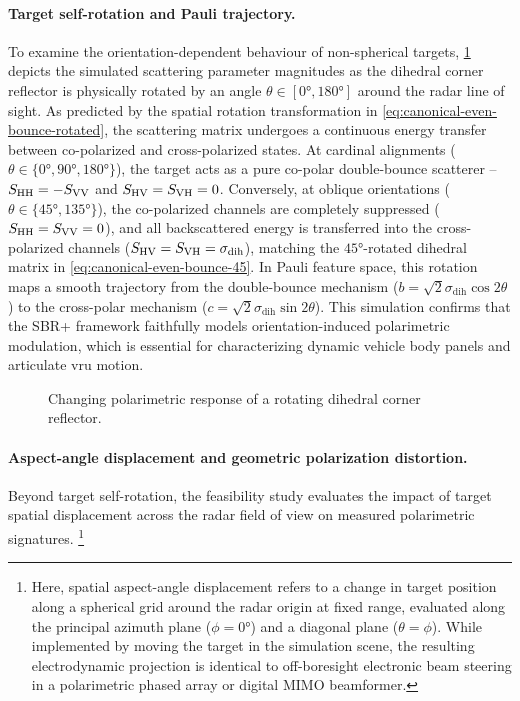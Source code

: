 \paragraph{Target self-rotation and Pauli trajectory.}
To examine the orientation-dependent behaviour of non-spherical targets, \cref{fig:sbr_parametric_dihedral_self_rotation} depicts the simulated scattering parameter magnitudes as the dihedral corner reflector is physically rotated by an angle $\theta \in [\ang{0}, \ang{180}]$ around the radar line of sight.
As predicted by the spatial rotation transformation in \cref{eq:canonical-even-bounce-rotated}, the scattering matrix undergoes a continuous energy transfer between co-polarized and cross-polarized states.
At cardinal alignments ($\theta \in \{\ang{0}, \ang{90}, \ang{180}\}$), the target acts as a pure co-polar double-bounce scatterer -- $S_{\mathrm{HH}} = -S_{\mathrm{VV}}$ and $S_{\mathrm{HV}} = S_{\mathrm{VH}} = 0$.
Conversely, at oblique orientations ($\theta \in \{\ang{45}, \ang{135}\}$), the co-polarized channels are completely suppressed ($S_{\mathrm{HH}} = S_{\mathrm{VV}} = 0$), and all backscattered energy is transferred into the cross-polarized channels ($S_{\mathrm{HV}} = S_{\mathrm{VH}} = \sigma_{\text{dih}}$), matching the $\ang{45}$-rotated dihedral matrix in \cref{eq:canonical-even-bounce-45}.
In Pauli feature space, this rotation maps a smooth trajectory from the double-bounce mechanism ($b = \sqrt{2}\sigma_{\text{dih}}\cos 2\theta$) to the cross-polar mechanism ($c = \sqrt{2}\sigma_{\text{dih}}\sin 2\theta$).
This simulation confirms that the SBR+ framework faithfully models orientation-induced polarimetric modulation, which is essential for characterizing dynamic vehicle body panels and articulate \gls{vru} motion.

\begin{figure}[p]
    \centering
    
    \caption{Changing polarimetric response of a rotating dihedral corner reflector.}
    \label{fig:sbr_parametric_dihedral_self_rotation}
\end{figure}

\paragraph{Aspect-angle displacement and geometric polarization distortion.}
Beyond target self-rotation, the feasibility study evaluates the impact of target spatial displacement across the radar field of view on measured polarimetric signatures.%
    \footnote{Here, spatial aspect-angle displacement refers to a change in target position along a spherical grid around the radar origin at fixed range, evaluated along the principal azimuth plane ($\phi = \ang{0}$) and a diagonal plane ($\theta = \phi$).
    While implemented by moving the target in the simulation scene, the resulting electrodynamic projection is identical to off-boresight electronic beam steering in a polarimetric phased array or digital MIMO beamformer.}


